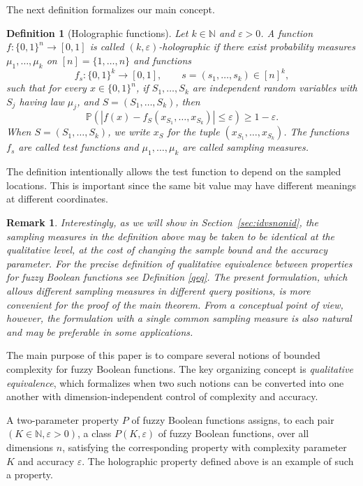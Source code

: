 \documentclass[11pt]{amsart}
\newtheorem{definition}[theorem]{Definition}
\newtheorem{remark}[theorem]{Remark}
\newcommand{\Pp}{\mathbb P}
\newcommand{\N}{\mathbb N}
\newcommand{\1}{\mathbf 1}
\newcommand{\cube}{\{0,1\}}
\newcommand{\abs}[1]{\left\lvert #1\right\rvert}
\begin{document}
The next definition formalizes our main concept.

\begin{definition}[Holographic functions]
Let $k\in\N$ and $\varepsilon>0$.  A function $f:\cube^n\to[0,1]$ is called \emph{$(k,\varepsilon)$-holographic} if there exist probability measures $\mu_1,\ldots,\mu_k$ on $[n]=\{1,\ldots,n\}$ and functions
\[
        f_s:\cube^k\to[0,1],\qquad s=(s_1,\ldots,s_k)\in[n]^k,
\]
such that for every $x\in\cube^n$, if $S_1,\ldots,S_k$ are independent random variables with $S_j$ having law $\mu_j$, and $S=(S_1,\ldots,S_k)$, then
\[
        \Pp\left(\abs{ f(x)-f_S(x_{S_1},\ldots,x_{S_k})}\leq \varepsilon\right)\geq 1-\varepsilon .
\]
When $S=(S_1,\ldots,S_k)$, we write $x_S$ for the tuple $(x_{S_1},\ldots,x_{S_k})$.  The functions $f_s$ are called \emph{test functions} and $\mu_1,\ldots,\mu_k$ are called \emph{sampling measures}.  
\end{definition}

The definition intentionally allows the test function to depend on the sampled locations.  This is important since the same bit value may have different meanings at different coordinates.  

\begin{remark}
Interestingly, as we will show in Section~\ref{sec:idvsnonid}, the sampling
measures in the definition above may be taken to be identical at the qualitative
level, at the cost of changing the sample bound and the accuracy parameter. For the precise definition of qualitative equivalence between properties for fuzzy Boolean functions see Definition \ref{qeq}. The present formulation, which allows different sampling measures in different
query positions, is more convenient for the proof of the main theorem.  From a
conceptual point of view, however, the formulation with a single common
sampling measure is also natural and may be preferable in some applications.
\end{remark}

The main purpose of this paper is to compare several notions of bounded
complexity for fuzzy Boolean functions.  The key organizing concept is
\emph{qualitative equivalence}, which formalizes when two such notions can be
converted into one another with dimension-independent control of complexity and
accuracy. 

A two-parameter property \(P\) of fuzzy Boolean functions assigns, to each
pair \((K\in\mathbb{N},\varepsilon>0)\), a class \(P(K,\varepsilon)\) of fuzzy Boolean
functions, over all dimensions \(n\), satisfying the corresponding property
with complexity parameter \(K\) and accuracy \(\varepsilon\).  The holographic
property defined above is an example of such a property.
\end{document}
